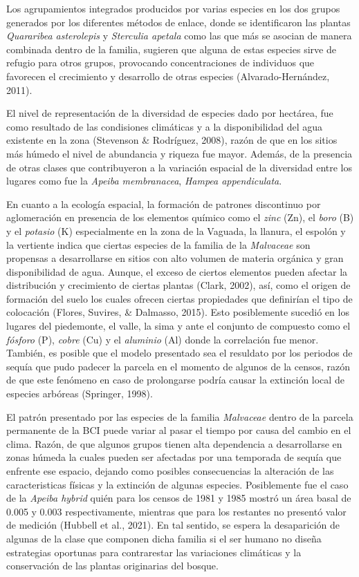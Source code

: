 \documentclass[11pt,]{article}
\begin{document}
Los agrupamientos integrados producidos por varias especies en los dos
grupos generados por los diferentes métodos de enlace, donde se
identificaron las plantas \emph{Quararibea asterolepis} y
\emph{Sterculia apetala} como las que más se asocian de manera combinada
dentro de la familia, sugieren que alguna de estas especies sirve de
refugio para otros grupos, provocando concentraciones de individuos que
favorecen el crecimiento y desarrollo de otras especies
(Alvarado-Hernández, 2011).

El nivel de representación de la diversidad de especies dado por
hectárea, fue como resultado de las condisiones climáticas y a la
disponibilidad del agua existente en la zona (Stevenson \& Rodríguez,
2008), razón de que en los sitios más húmedo el nivel de abundancia y
riqueza fue mayor. Además, de la presencia de otras clases que
contribuyeron a la variación espacial de la diversidad entre los lugares
como fue la \emph{Apeiba membranacea}, \emph{Hampea appendiculata}.

En cuanto a la ecología espacial, la formación de patrones discontinuo
por aglomeración en presencia de los elementos químico como el
\emph{zinc} (Zn), el \emph{boro} (B) y el \emph{potasio} (K)
especialmente en la zona de la Vaguada, la llanura, el espolón y la
vertiente indica que ciertas especies de la familia de la
\emph{Malvaceae} son propensas a desarrollarse en sitios con alto
volumen de materia orgánica y gran disponibilidad de agua. Aunque, el
exceso de ciertos elementos pueden afectar la distribución y crecimiento
de ciertas plantas (Clark, 2002), así, como el origen de formación del
suelo los cuales ofrecen ciertas propiedades que definirían el tipo de
colocación (Flores, Suvires, \& Dalmasso, 2015). Esto posiblemente
sucedió en los lugares del piedemonte, el valle, la sima y ante el
conjunto de compuesto como el \emph{fósforo} (P), \emph{cobre} (Cu) y el
\emph{aluminio} (Al) donde la correlación fue menor. También, es posible
que el modelo presentado sea el resuldato por los periodos de sequía que
pudo padecer la parcela en el momento de algunos de la censos, razón de
que este fenómeno en caso de prolongarse podría causar la extinción
local de especies arbóreas (Springer, 1998).

El patrón presentado por las especies de la familia \emph{Malvaceae}
dentro de la parcela permanente de la BCI puede variar al pasar el
tiempo por causa del cambio en el clima. Razón, de que algunos grupos
tienen alta dependencia a desarrollarse en zonas húmeda la cuales pueden
ser afectadas por una temporada de sequía que enfrente ese espacio,
dejando como posibles consecuencias la alteración de las caracteristicas
físicas y la extinción de algunas especies. Posiblemente fue el caso de
la \emph{Apeiba hybrid} quién para los censos de 1981 y 1985 mostró un
área basal de 0.005 y 0.003 respectivamente, mientras que para los
restantes no presentó valor de medición (Hubbell et al., 2021). En tal
sentido, se espera la desaparición de algunas de la clase que componen
dicha familia si el ser humano no diseña estrategias oportunas para
contrarestar las variaciones climáticas y la conservación de las plantas
originarias del bosque.
\end{document}
